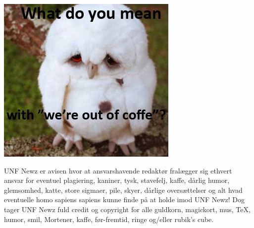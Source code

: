 \begin{minipage}[b]{0.95\linewidth}
\begin{minipage}[t]{0.47\textwidth}
\vspace{1mm}
\includegraphics[width=\linewidth]{coffee-ugle2.jpg}
\vspace{-3mm}
\end{minipage}

\begin{center}
\tiny UNF Newz er avisen hvor at ansvarshavende redaktør fralægger sig ethvert ansvar for eventuel plagiering, kaniner, tysk, stavefelj, kaffe, dårlig humor, glemsomhed, katte, store sigmaer, pile, skyer, dårlige oversættelser og alt hvad eventuelle homo sapiens sapiens kunne finde på at holde imod UNF Newz! Dog tager UNF Newz fuld credit og copyright for alle guldkorn, magickort, mus, \TeX, humor, smil, Mortener, kaffe, før-fremtid, ringe og/eller rubik's cube.
\end{center}
\end{minipage}

